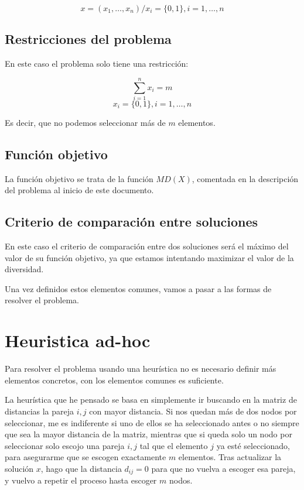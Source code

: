 \[
x = (x_1, \dots, x_n) / x_i = \{0, 1\}, i = 1, \dots, n
\]

\subsection{Restricciones del problema}

En este caso el problema solo tiene una restricción:


\[
\displaystyle\sum_{i=1}^{n} x_i = m
\]
\[
x_i = \{0,1\}, i = 1, \dots, n
\]

Es decir, que no podemos seleccionar más de $m$ elementos.

\subsection{Función objetivo}

La función objetivo se trata de la función $MD(X)$, comentada en la descripción del problema al inicio de este documento.

\subsection{Criterio de comparación entre soluciones}

En este caso el criterio de comparación entre dos soluciones será el máximo del valor de su función objetivo, ya que estamos intentando maximizar el valor de la diversidad.

Una vez definidos estos elementos comunes, vamos a pasar a las formas de resolver el problema.

\newpage

\section{Heuristica ad-hoc}

Para resolver el problema usando una heurística no es necesario definir más elementos concretos, con los elementos comunes es suficiente.

La heurística que he pensado se basa en simplemente ir buscando en la matriz de distancias la pareja $i, j$ con mayor distancia. Si nos quedan más de dos nodos por seleccionar, me es indiferente si uno de ellos se ha seleccionado antes o no siempre que sea la mayor distancia de la matriz, mientras que si queda solo un nodo por seleccionar solo escojo una pareja $i, j$ tal que el elemento $j$ ya esté seleccionado, para asegurarme que se escogen exactamente $m$ elementos. Tras actualizar la solución $x$, hago que la distancia $d_{ij} = 0$ para que no vuelva a escoger esa pareja, y vuelvo a repetir el proceso hasta escoger $m$ nodos.

